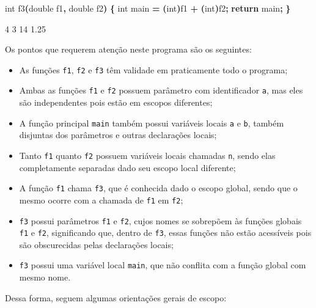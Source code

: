 \documentclass[
  11pt,
  a4paper,
]{scrbook}
\newenvironment{Shaded}{\begin{snugshade}}{\end{snugshade}}
\newcommand{\ControlFlowTok}[1]{\textcolor[rgb]{0.13,0.29,0.53}{\textbf{#1}}}
\newcommand{\DataTypeTok}[1]{\textcolor[rgb]{0.13,0.29,0.53}{#1}}
\newcommand{\NormalTok}[1]{#1}
\newcommand{\OperatorTok}[1]{\textcolor[rgb]{0.81,0.36,0.00}{\textbf{#1}}}
\providecommand{\tightlist}{%
  \setlength{\itemsep}{0pt}\setlength{\parskip}{0pt}}\usepackage{longtable,booktabs,array}
\begin{document}
\begin{Shaded}
\begin{Highlighting}[]
\DataTypeTok{int}\NormalTok{ f3}\OperatorTok{(}\DataTypeTok{double}\NormalTok{ f1}\OperatorTok{,} \DataTypeTok{double}\NormalTok{ f2}\OperatorTok{)} \OperatorTok{\{}
    \DataTypeTok{int}\NormalTok{ main }\OperatorTok{=} \OperatorTok{(}\DataTypeTok{int}\OperatorTok{)}\NormalTok{f1 }\OperatorTok{+} \OperatorTok{(}\DataTypeTok{int}\OperatorTok{)}\NormalTok{f2}\OperatorTok{;}
    \ControlFlowTok{return}\NormalTok{ main}\OperatorTok{;}
\OperatorTok{\}}
\end{Highlighting}
\end{Shaded}

\begin{Shaded}
\begin{Highlighting}[]
\NormalTok{4 3 14 1.25}
\end{Highlighting}
\end{Shaded}

Os pontos que requerem atenção neste programa são os seguintes:

\begin{itemize}
\tightlist
\item
  As funções \texttt{f1}, \texttt{f2} e \texttt{f3} têm validade em
  praticamente todo o programa;
\item
  Ambas as funções \texttt{f1} e \texttt{f2} possuem parâmetro com
  identificador \texttt{a}, mas eles são independentes pois estão em
  escopos diferentes;
\item
  A função principal \texttt{main} também possui variáveis locais
  \texttt{a} e \texttt{b}, também disjuntas dos parâmetros e outras
  declarações locais;
\item
  Tanto \texttt{f1} quanto \texttt{f2} possuem variáveis locais chamadas
  \texttt{n}, sendo elas completamente separadas dado seu escopo local
  diferente;
\item
  A função \texttt{f1} chama \texttt{f3}, que é conhecida dado o escopo
  global, sendo que o mesmo ocorre com a chamada de \texttt{f1} em
  \texttt{f2};
\item
  \texttt{f3} possui parâmetros \texttt{f1} e \texttt{f2}, cujos nomes
  se sobrepõem às funções globais \texttt{f1} e \texttt{f2},
  significando que, dentro de \texttt{f3}, essas funções não estão
  acessíveis pois são obscurecidas pelas declarações locais;
\item
  \texttt{f3} possui uma variável local \texttt{main}, que não conflita
  com a função global com mesmo nome.
\end{itemize}

Dessa forma, seguem algumas orientações gerais de escopo:
\end{document}
